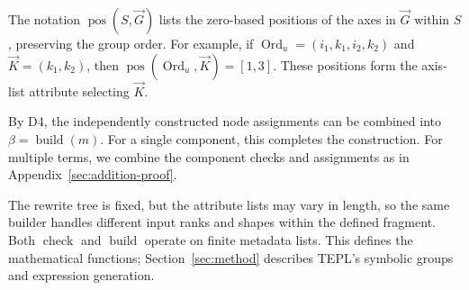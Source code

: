 The notation $\operatorname{pos}(S,\vec G)$ lists the zero-based positions
of the axes in $\vec G$ within $S$, preserving the group order.
For example, if $\operatorname{Ord}_u=(i_1,k_1,i_2,k_2)$ and
$\vec K=(k_1,k_2)$, then
$\operatorname{pos}(\operatorname{Ord}_u,\vec K)=[1,3]$.
These positions form the axis-list attribute selecting $\vec K$.

By D4, the independently constructed node assignments can be combined
into $\beta=\operatorname{build}(m)$. For a single component, this completes
the construction. For multiple terms, we combine the component checks and
assignments as in Appendix~\ref{sec:addition-proof}.

The rewrite tree is fixed, but the
attribute lists may vary in length, so the same builder handles different
input ranks and shapes within the defined fragment. Both $\operatorname{check}$
and $\operatorname{build}$ operate on finite metadata lists.
This defines the mathematical functions; Section~\ref{sec:method}
describes TEPL's symbolic groups and expression generation.
